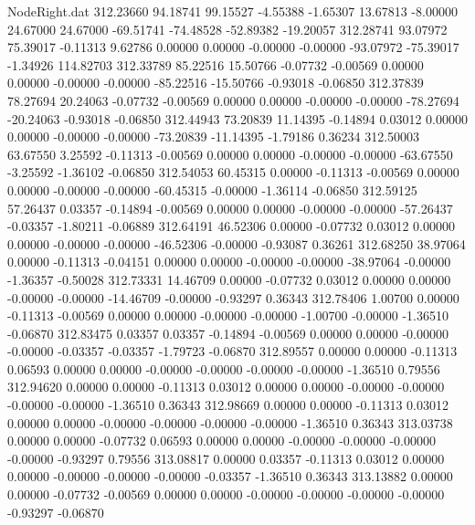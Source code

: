 \begin{filecontents}{NodeRight.dat}
 312.23660   94.18741   99.15527    -4.55388   -1.65307   13.67813   -8.00000   24.67000   24.67000  -69.51741  -74.48528  -52.89382  -19.20057
 312.28741   93.07972   75.39017    -0.11313    9.62786    0.00000    0.00000   -0.00000   -0.00000  -93.07972  -75.39017   -1.34926  114.82703
 312.33789   85.22516   15.50766    -0.07732   -0.00569    0.00000    0.00000   -0.00000   -0.00000  -85.22516  -15.50766   -0.93018   -0.06850
 312.37839   78.27694   20.24063    -0.07732   -0.00569    0.00000    0.00000   -0.00000   -0.00000  -78.27694  -20.24063   -0.93018   -0.06850
 312.44943   73.20839   11.14395    -0.14894    0.03012    0.00000    0.00000   -0.00000   -0.00000  -73.20839  -11.14395   -1.79186    0.36234
 312.50003   63.67550    3.25592    -0.11313   -0.00569    0.00000    0.00000   -0.00000   -0.00000  -63.67550   -3.25592   -1.36102   -0.06850
 312.54053   60.45315    0.00000    -0.11313   -0.00569    0.00000    0.00000   -0.00000   -0.00000  -60.45315   -0.00000   -1.36114   -0.06850
 312.59125   57.26437    0.03357    -0.14894   -0.00569    0.00000    0.00000   -0.00000   -0.00000  -57.26437   -0.03357   -1.80211   -0.06889
 312.64191   46.52306    0.00000    -0.07732    0.03012    0.00000    0.00000   -0.00000   -0.00000  -46.52306   -0.00000   -0.93087    0.36261
 312.68250   38.97064    0.00000    -0.11313   -0.04151    0.00000    0.00000   -0.00000   -0.00000  -38.97064   -0.00000   -1.36357   -0.50028
 312.73331   14.46709    0.00000    -0.07732    0.03012    0.00000    0.00000   -0.00000   -0.00000  -14.46709   -0.00000   -0.93297    0.36343
 312.78406    1.00700    0.00000    -0.11313   -0.00569    0.00000    0.00000   -0.00000   -0.00000   -1.00700   -0.00000   -1.36510   -0.06870
 312.83475    0.03357    0.03357    -0.14894   -0.00569    0.00000    0.00000   -0.00000   -0.00000   -0.03357   -0.03357   -1.79723   -0.06870
 312.89557    0.00000    0.00000    -0.11313    0.06593    0.00000    0.00000   -0.00000   -0.00000   -0.00000   -0.00000   -1.36510    0.79556
 312.94620    0.00000    0.00000    -0.11313    0.03012    0.00000    0.00000   -0.00000   -0.00000   -0.00000   -0.00000   -1.36510    0.36343
 312.98669    0.00000    0.00000    -0.11313    0.03012    0.00000    0.00000   -0.00000   -0.00000   -0.00000   -0.00000   -1.36510    0.36343
 313.03738    0.00000    0.00000    -0.07732    0.06593    0.00000    0.00000   -0.00000   -0.00000   -0.00000   -0.00000   -0.93297    0.79556
 313.08817    0.00000    0.03357    -0.11313    0.03012    0.00000    0.00000   -0.00000   -0.00000   -0.00000   -0.03357   -1.36510    0.36343
 313.13882    0.00000    0.00000    -0.07732   -0.00569    0.00000    0.00000   -0.00000   -0.00000   -0.00000   -0.00000   -0.93297   -0.06870

\end{filecontents}
